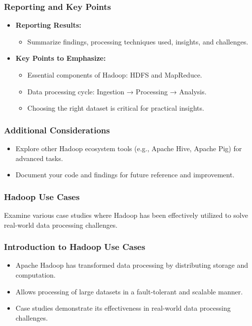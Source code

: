 \documentclass[aspectratio=169]{beamer}
\begin{document}
\begin{frame}[fragile]
    \frametitle{Reporting and Key Points}
    \begin{itemize}
        \item \textbf{Reporting Results:}
            \begin{itemize}
                \item Summarize findings, processing techniques used, insights, and challenges.
            \end{itemize}
        
        \item \textbf{Key Points to Emphasize:}
            \begin{itemize}
                \item Essential components of Hadoop: HDFS and MapReduce.
                \item Data processing cycle: Ingestion → Processing → Analysis.
                \item Choosing the right dataset is critical for practical insights.
            \end{itemize}
    \end{itemize}
\end{frame}

\begin{frame}[fragile]
    \frametitle{Additional Considerations}
    \begin{itemize}
        \item Explore other Hadoop ecosystem tools (e.g., Apache Hive, Apache Pig) for advanced tasks.
        \item Document your code and findings for future reference and improvement.
    \end{itemize}
\end{frame}

\begin{frame}
    \frametitle{Hadoop Use Cases}
    Examine various case studies where Hadoop has been effectively utilized to solve real-world data processing challenges.
\end{frame}

\begin{frame}
    \frametitle{Introduction to Hadoop Use Cases}
    \begin{itemize}
        \item Apache Hadoop has transformed data processing by distributing storage and computation.
        \item Allows processing of large datasets in a fault-tolerant and scalable manner.
        \item Case studies demonstrate its effectiveness in real-world data processing challenges.
    \end{itemize}
\end{frame}
\end{document}
